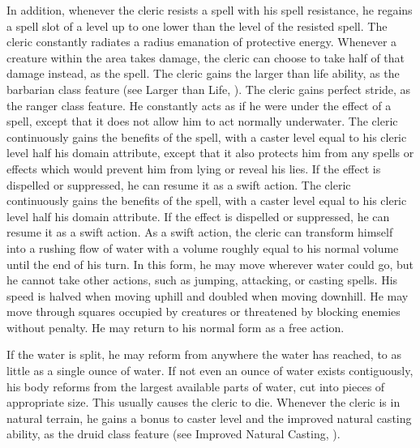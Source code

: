 In addition, whenever the cleric resists a spell with his spell resistance, he regains a spell slot of a level up to one lower than the level of the resisted spell.
The cleric constantly radiates a \areamed radius emanation of protective energy.
Whenever a creature within the area takes damage, the cleric can choose to take half of that damage instead, as the  spell.
The cleric gains the larger than life ability, as the barbarian class feature (see Larger than Life, ).
The cleric gains perfect stride, as the ranger class feature.
He constantly acts as if he were under the effect of a  spell, except that it does not allow him to act normally underwater.
 The cleric continuously gains the benefits of the 
spell, with a caster level equal to his cleric level \add half his domain attribute, except that it also protects him from any spells or effects which would prevent him from lying or reveal his lies.
If the effect is dispelled or suppressed, he can resume it as a swift action.
 The cleric continuously gains the benefits of the 
spell, with a caster level equal to his cleric level \add half his domain attribute.
If the effect is dispelled or suppressed, he can resume it as a swift action.
As a swift action, the cleric can transform himself into a rushing flow of water with a volume roughly equal to his normal volume until the end of his turn.
In this form, he may move wherever water could go, but he cannot take other actions, such as jumping, attacking, or casting spells.
His speed is halved when moving uphill and doubled when moving downhill.
He may move through squares occupied by creatures or threatened by blocking enemies without penalty.
He may return to his normal form as a free action.
\par If the water is split, he may reform from anywhere the water has reached, to as little as a single ounce of water.
If not even an ounce of water exists contiguously, his body reforms from the largest available parts of water, cut into pieces of appropriate size.
This usually causes the cleric to die.
Whenever the cleric is in natural terrain, he gains a  bonus to caster level and the improved natural casting ability, as the druid class feature (see Improved Natural Casting, ).

